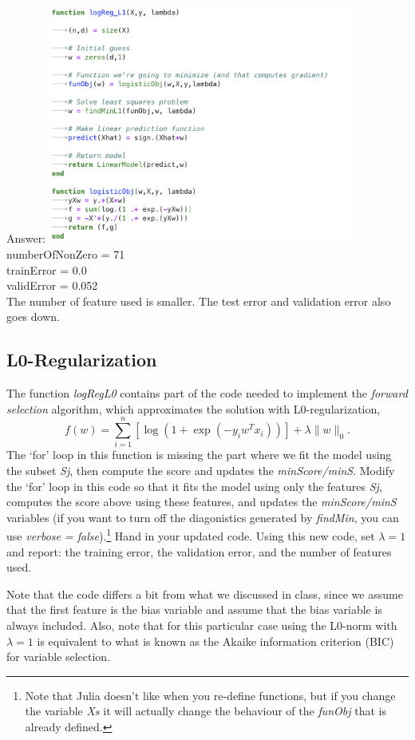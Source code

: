 \documentclass{article}
\def\ans#1{\par\gre{Answer: #1}}
\def\blu#1{{\color{blu}#1}}
\def\gre#1{{\color{gre}#1}}
\def\norm#1{\|#1\|}
\begin{document}
 \ans{ \includegraphics[width=10cm]{Q23Code3.png} \\
 numberOfNonZero = 71 \\
 trainError = 0.0 \\
 validError = 0.052 \\
 The number of feature used is smaller. The test error and validation error also goes down.
 }


\subsection{L0-Regularization}

The function \emph{logRegL0} contains part of the code needed to implement the \emph{forward selection} algorithm, which approximates the solution with L0-regularization,
\[
f(w) =  \sum_{i=1}^n \left[\log(1+\exp(-y_iw^Tx_i))\right] + \lambda\norm{w}_0.
\]
The `for' loop in this function is missing the part where we fit the model using the subset \emph{Sj}, then compute the score and updates the \emph{minScore/minS}. Modify the `for' loop in this code so that it fits the model using only the features \emph{Sj}, computes the score above using these features, and updates the \emph{minScore/minS} variables (if you want to turn off the diagonistics generated by \emph{findMin}, you can use \emph{verbose = false}).\footnote{Note that Julia doesn't like when you re-define functions, but if you change the variable \emph{Xs} it will actually change the behaviour of the \emph{funObj} that is already defined.}
\blu{Hand in your updated code. Using this new code, set $\lambda = 1$ and report: the training error, the validation error, and the number of features used.}

Note that the code differs a bit from what we discussed in class, since we assume that the first feature is the bias variable and assume that the bias variable is always included. Also, note that for this particular case using the L0-norm with $\lambda=1$ is equivalent to what is known as the Akaike information criterion (BIC) for variable selection.
\end{document}
